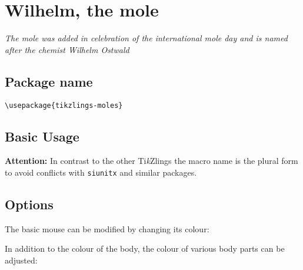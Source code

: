 \documentclass[parskip=half]{scrartcl}
\newcommand{\tikzlings}{Ti\emph{k}Zlings\xspace}
\begin{document}
%
%
\clearpage
\section[Mole]{Wilhelm, the mole}

\emph{The mole was added in celebration of the international mole day and is named after the chemist Wilhelm Ostwald}

\subsection{Package name}

\begin{tcolorbox}[lower separated=false, lefthand width=.8\linewidth]
\vspace*{0.5cm}
\lstinline|\usepackage{tikzlings-moles}| 
\vspace*{0.5cm}
\end{tcolorbox}

\subsection{Basic Usage}

\textcolor{red!60!black}{\textbf{Attention:} In contrast to the other \tikzlings the macro name is the plural form to avoid conflicts with  \lstinline|siunitx| and similar packages.}
\begin{tcblisting}{}
\moles
\end{tcblisting}

\subsection{Options}

The basic mouse can be modified by changing its colour:
\begin{tcblisting}{}
\moles[body=blue]
\end{tcblisting}

In addition to the colour of the body, the colour of various body parts can be adjusted:
\begin{tcblisting}{}
\moles[muzzle=red]
\end{tcblisting}

\begin{tcblisting}{}
\moles[hands=red]
\end{tcblisting}
\end{document}
